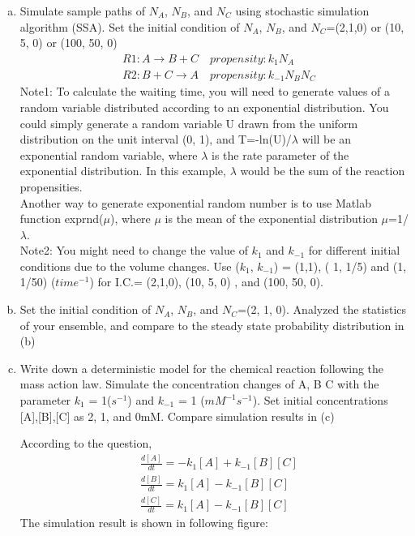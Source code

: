 \documentclass[paper=a4, fontsize=11pt]{scrartcl} %
\numberwithin{equation}{section} %
\numberwithin{figure}{section} %
\numberwithin{table}{section} %
\begin{document}
\begin{enumerate}[a)]
		\item  Simulate sample paths of $N_A$, $N_B$, and $N_C$ using stochastic simulation algorithm (SSA). Set the initial condition of $N_A$, $N_B$, and $N_C$=(2,1,0) or (10, 5, 0) or (100, 50, 0)
		\begin{align*}
			&R1: A \xrightarrow{} B + C \quad propensity: k_1N_A \\
			&R2: B + C \xrightarrow{} A \quad propensity: k_{-1}N_BN_C
		\end{align*}
		Note1: To calculate the waiting time, you will need to generate values of a random variable distributed according to an exponential distribution. You could simply generate a random variable U drawn from the uniform distribution on the unit interval (0, 1), and T=-ln(U)/$\lambda$ will be an exponential random variable, where $\lambda$ is the rate parameter of the exponential distribution. In this example, $\lambda$ would be the sum of the reaction propensities. \\
		Another way to generate exponential random number is to use Matlab function exprnd($\mu$), where $\mu$ is the mean of the exponential distribution $\mu$=1/$\lambda$. \\
		Note2: You might need to change the value of $k_1$ and $k_{-1}$ for different initial conditions due to the volume changes. Use ($k_1$, $k_{-1}$) = (1,1), ( 1, 1/5) and (1, 1/50) ($time^{-1}$) for I.C.= (2,1,0), (10, 5, 0) , and (100, 50, 0).

		\item Set the initial condition of $N_A$, $N_B$, and $N_C$=(2, 1, 0). Analyzed the statistics of your ensemble, and compare to the steady state probability distribution in (b)

		\item Write down a deterministic model for the chemical reaction following the mass action law. Simulate the concentration changes of A, B C with the parameter $k_1$ = 1($s^{-1}$) and $k_{-1}$ = 1 ($mM^{-1}s^{-1}$). Set initial concentrations [A],[B],[C] as 2, 1, and 0mM. Compare simulation results in (c)

		According to the question,
		\begin{align*}
			&\frac{d[A]}{dt} = -k_1[A] + k_{-1}[B][C]\\
			&\frac{d[B]}{dt} = k_1[A] - k_{-1}[B][C]\\
			&\frac{d[C]}{dt} = k_1[A] - k_{-1}[B][C]
		\end{align*}
		The simulation result is shown in following figure:


	\end{enumerate}
\end{document}

